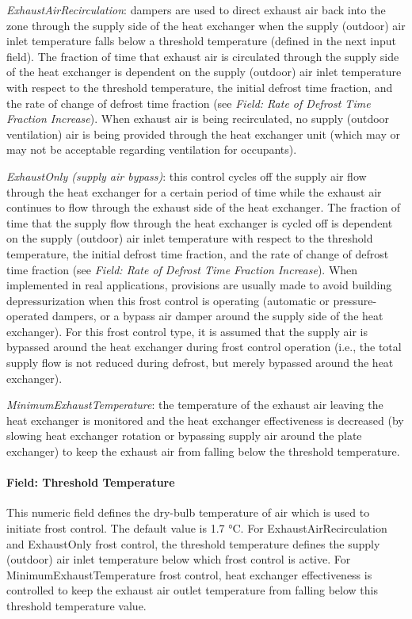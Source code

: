 \emph{ExhaustAirRecirculation}: dampers are used to direct exhaust air back into the zone through the supply side of the heat exchanger when the supply (outdoor) air inlet temperature falls below a threshold temperature (defined in the next input field). The fraction of time that exhaust air is circulated through the supply side of the heat exchanger is dependent on the supply (outdoor) air inlet temperature with respect to the threshold temperature, the initial defrost time fraction, and the rate of change of defrost time fraction (see \emph{Field: Rate of Defrost Time Fraction Increase}). When exhaust air is being recirculated, no supply (outdoor ventilation) air is being provided through the heat exchanger unit (which may or may not be acceptable regarding ventilation for occupants).

\emph{ExhaustOnly (supply air bypass)}: this control cycles off the supply air flow through the heat exchanger for a certain period of time while the exhaust air continues to flow through the exhaust side of the heat exchanger. The fraction of time that the supply flow through the heat exchanger is cycled off is dependent on the supply (outdoor) air inlet temperature with respect to the threshold temperature, the initial defrost time fraction, and the rate of change of defrost time fraction (see \emph{Field: Rate of Defrost Time Fraction Increase}). When implemented in real applications, provisions are usually made to avoid building depressurization when this frost control is operating (automatic or pressure-operated dampers, or a bypass air damper around the supply side of the heat exchanger). For this frost control type, it is assumed that the supply air is bypassed around the heat exchanger during frost control operation (i.e., the total supply flow is not reduced during defrost, but merely bypassed around the heat exchanger).

\emph{MinimumExhaustTemperature}: the temperature of the exhaust air leaving the heat exchanger is monitored and the heat exchanger effectiveness is decreased (by slowing heat exchanger rotation or bypassing supply air around the plate exchanger) to keep the exhaust air from falling below the threshold temperature.

\paragraph{Field: Threshold Temperature}\label{field-threshold-temperature}

This numeric field defines the dry-bulb temperature of air which is used to initiate frost control. The default value is 1.7 °C. For ExhaustAirRecirculation and ExhaustOnly frost control, the threshold temperature defines the supply (outdoor) air inlet temperature below which frost control is active. For MinimumExhaustTemperature frost control, heat exchanger effectiveness is controlled to keep the exhaust air outlet temperature from falling below this threshold temperature value.

